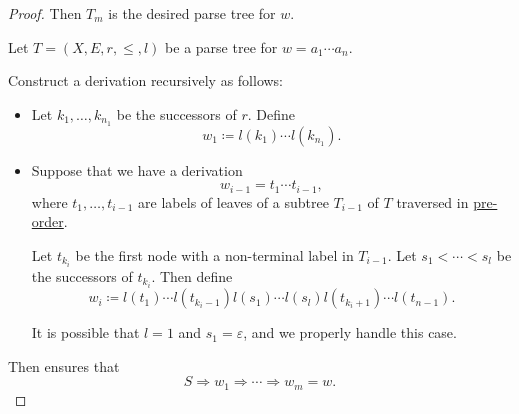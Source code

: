 \begin{proof}
  Then \( T_m \) is the desired parse tree for \( w \).

  \NecessitySubProof Let \( T = (X, E, r, \leq, l) \) be a parse tree for \( w = a_1 \cdots a_n \).

  Construct a derivation recursively as follows:
  \begin{itemize}
    \item Let \( k_1, \ldots, k_{n_1} \) be the successors of \( r \). Define
    \begin{equation*}
      w_1 \coloneqq l(k_1) \cdots l(k_{n_1}).
    \end{equation*}

    \item Suppose that we have a derivation
    \begin{equation*}
      w_{i-1} = t_1 \cdots t_{i-1},
    \end{equation*}
    where \( t_1, \ldots, t_{i-1} \) are labels of leaves of a subtree \( T_{i-1} \) of \( T \) traversed in \hyperref[def:traversal_ordering]{pre-order}.

    Let \( t_{k_i} \) be the first node with a non-terminal label in \( T_{i-1} \). Let \( s_1 < \cdots < s_l \) be the successors of \( t_{k_i} \). Then define
    \begin{equation*}
      w_i \coloneqq l(t_1) \cdots l(t_{k_i - 1}) l(s_1) \cdots l(s_l) l(t_{k_i + 1}) \cdots l(t_{n-1}).
    \end{equation*}

    It is possible that \( l = 1 \) and \( s_1 = \varepsilon \), and we properly handle this case.
  \end{itemize}

  Then  ensures that
  \begin{equation*}
    S \Rightarrow w_1 \Rightarrow \cdots \Rightarrow w_m = w.
  \end{equation*}
\end{proof}

